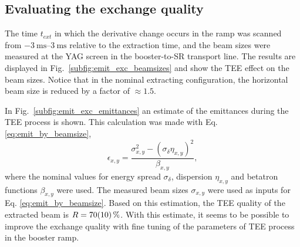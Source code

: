 \documentclass[a4paper,
               keeplastbox,   %
              nospread,     %
               ]{jacow}
\begin{document}
\subsection{Evaluating the exchange quality}
The time $t_{ext}$ in which the derivative change occurs in the ramp was scanned from $\qtyrange{-3}{+3}{\milli \second}$ relative to the extraction time, %
and the beam sizes were measured at the YAG screen in the booster-to-SR transport line. The results are displayed in Fig.~\ref{subfig:emit_exc_beamsizes} and show the TEE effect on the beam sizes. Notice that in the nominal extracting configuration, the horizontal beam size is reduced by a factor of $\approx 1.5$.

In Fig.~\ref{subfig:emit_exc_emittances} an estimate of the emittances during the TEE process is shown. This calculation was made with Eq. \eqref{eq:emit_by_beamsize},
\begin{equation}
    \epsilon_{x, y} = \frac{\sigma_{x, y}^2 - (\sigma_\delta \eta_{x,y})^2}{\beta_{x, y}},
    \label{eq:emit_by_beamsize}
\end{equation}
where the nominal values for energy spread $\sigma_\delta$, dispersion $\eta_{x,y}$ and betatron functions $\beta_{x, y}$ were used. The measured beam sizes $\sigma_{x, y}$ were used as inputs for Eq. \eqref{eq:emit_by_beamsize}. Based on this estimation, the TEE quality of the extracted beam is $R = \SI{70\pm10}{\%}$. With this estimate, it seems to be possible to improve the exchange quality with fine tuning of the parameters of TEE process in the booster ramp.
\end{document}
